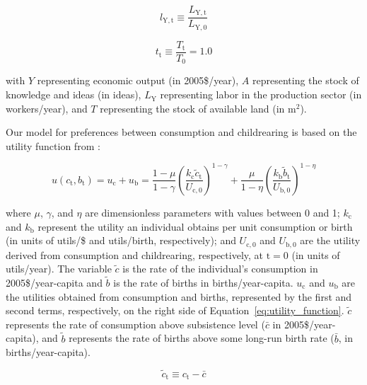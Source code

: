 \documentclass[letterpaper,12pt]{article}
\begin{document}
\begin{equation} \label{eq:index_l}
	l_\mathrm{Y,t} \equiv \frac{L_\mathrm{Y,t}}{L_\mathrm{Y,0}}
\end{equation}

\begin{equation} \label{eq:index_t}
	t_\mathrm{t} \equiv \frac{T_\mathrm{t}}{T_\mathrm{0}} = 1.0
\end{equation}

\noindent with $Y$ representing economic output (in 2005\$/year), $A$ representing the stock of knowledge and ideas (in ideas), $L_\mathrm{Y}$ representing labor in the production sector (in workers/year), and $T$ representing the stock of available land (in m$^2$).

Our model for preferences between consumption and childrearing is based on the utility function from \citet{Jones:2001wn}:

\begin{equation} \label{eq:utility_function}
	u(c_\mathrm{t}, b_\mathrm{t}) = u_\mathrm{c} + u_\mathrm{b} = \frac{1-\mu}{1-\gamma} \left(\frac{k_\mathrm{c} \tilde c_\mathrm{t}}{U_\mathrm{c,0}} \right)^{1-\gamma} + \frac{\mu}{1-\eta} \left(\frac{k_\mathrm{b} \tilde b_\mathrm{t}}{U_\mathrm{b,0}} \right)^{1-\eta}
\end{equation}

\noindent where $\mu$, $\gamma$, and $\eta$ are dimensionless parameters with values between 0 and 1; $k_\mathrm{c}$ and $k_\mathrm{b}$ represent the utility an individual obtains per unit consumption or birth (in units of utils/\$ and utils/birth, respectively); and $U_{\mathrm{c,0}}$ and $U_{\mathrm{b,0}}$ are the utility derived from consumption and childrearing, respectively, at $\mathrm{t} = 0$ (in units of utils/year). The variable $\tilde c$ is the rate of the individual's consumption in 2005\$/year-capita and $\tilde b$ is the rate of births in births/year-capita. $u_\mathrm{c}$ and $u_\mathrm{b}$ are the utilities obtained from consumption and births, represented by the first and second terms, respectively, on the right side of Equation~\ref{eq:utility_function}. $\tilde c$ represents the rate of consumption above subsistence level ($\bar c$ in 2005\$/year-capita), and $\tilde b$ represents the rate of births above some long-run birth rate ($\bar b$, in births/year-capita).

\begin{equation} \label{eq:c_tilde}
	\tilde c_\mathrm{t} \equiv c_\mathrm{t} - \bar c
\end{equation}
\end{document}
